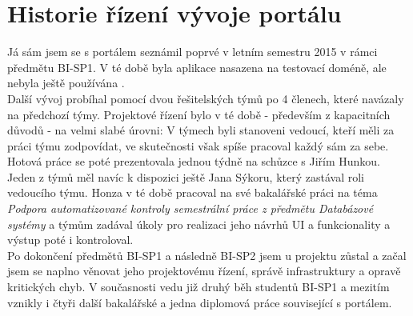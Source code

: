 \section{Historie řízení vývoje portálu} \label{intro:management}

Já sám jsem se s portálem seznámil poprvé v letním semestru 2015 v rámci předmětu BI-SP1. V té době byla aplikace nasazena na testovací doméně, ale nebyla ještě používána .\\
Další vývoj probíhal pomocí dvou řešitelských týmů po 4 členech, které navázaly na předchozí týmy. Projektové řízení bylo v té době - především z kapacitních důvodů - na velmi slabé úrovni: V týmech byli stanoveni vedoucí, kteří měli za práci týmu zodpovídat, ve skutečnosti však spíše pracoval každý sám za sebe. Hotová práce se poté prezentovala jednou týdně na schůzce s Jiřím Hunkou. Jeden z týmů měl navíc k dispozici ještě Jana Sýkoru, který zastával roli vedoucího týmu. Honza v té době pracoval na své bakalářské práci na téma \emph{Podpora automatizované kontroly semestrální práce z předmětu Databázové systémy} a týmům zadával úkoly pro realizaci jeho návrhů UI a funkcionality a výstup poté i kontroloval.\\
Po dokončení předmětů BI-SP1 a následně BI-SP2 jsem u projektu zůstal a začal jsem se naplno věnovat jeho projektovému řízení, správě infrastruktury a opravě kritických chyb. V současnosti vedu již druhý běh studentů BI-SP1 a mezitím vznikly i čtyři další bakalářské a jedna diplomová práce související s portálem.
